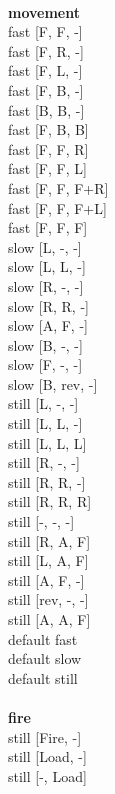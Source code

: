 \ \\ {\bf movement } \\
fast [F, F, -] \\
fast [F, R, -] \\
fast [F, L, -] \\
fast [F, B, -] \\
fast [B, B, -] \\
fast [F, B, B] \\
fast [F, F, R] \\
fast [F, F, L] \\
fast [F, F, F+R] \\
fast [F, F, F+L] \\
fast [F, F, F] \\
slow [L, -, -] \\
slow [L, L, -] \\
slow [R, -, -] \\
slow [R, R, -] \\
slow [A, F, -] \\
slow [B, -, -] \\
slow [F, -, -] \\
slow [B, rev, -] \\
still [L, -, -] \\
still [L, L, -] \\
still [L, L, L] \\
still [R, -, -] \\
still [R, R, -] \\
still [R, R, R] \\
still [-, -, -] \\
still [R, A, F] \\
still [L, A, F] \\
still [A, F, -] \\
still [rev, -, -] \\
still [A, A, F] \\
default fast \\
default slow \\
default still \\
\ \\ {\bf fire } \\
still [Fire, -] \\
still [Load, -] \\
still [-, Load] \\


